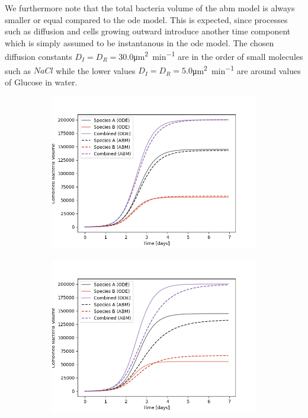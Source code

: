\documentclass[10pt,A4paper]{article}
\numberwithin{equation}{section}
\begin{document}
We furthermore note that the total bacteria volume of the \ac{abm} model is always smaller or equal compared to the \ac{ode} model.
This is expected, since processes such as diffusion and cells growing outward introduce another time component which is simply assumed to be instantanous in the \ac{ode} model.
The chosen diffusion constants $D_I=D_R=30.0$\unit{\micro\metre\squared\per\minute} are in the order of small molecules such as $NaCl$ while the lower values $D_I=D_R=5.0$\unit{\micro\metre\squared\per\minute} are around values of Glucose in water.
\begin{figure}
    \centering
    \begin{subfigure}[c]{0.5\columnwidth}
        \includegraphics[width=\columnwidth]{Figures/abm-homogenous/abm_ode_comparison.png}
    \end{subfigure}%
    \begin{subfigure}[c]{0.5\columnwidth}
        \includegraphics[width=\columnwidth]{Figures/abm-homogenous-low-diffusion/abm_ode_comparison.png}

\end{subfigure}
\end{figure}
\end{document}
